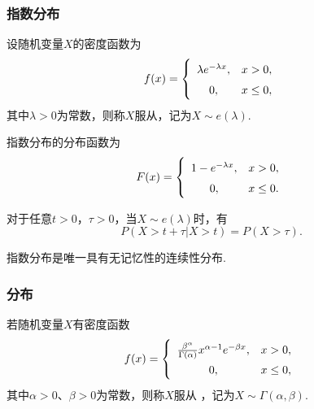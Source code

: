 \subsubsection{指数分布}
\begin{definition}
设随机变量\(X\)的密度函数为\begin{equation}
f(x) = \left\{ \def\arraystretch{1.5}
\begin{array}{cl}
\lambda e^{-\lambda x}, & x > 0, \\
0, & x \leq 0, \\
\end{array} \right.
\end{equation}其中\(\lambda > 0\)为常数，则称\(X\)服从，记为\(X \sim e(\lambda)\).
\end{definition}

\begin{theorem}
指数分布的分布函数为\begin{equation}
F(x) = \left\{ \def\arraystretch{1.5}
\begin{array}{cl}
1 - e^{-\lambda x}, & x > 0, \\
0, & x \leq 0. \\
\end{array} \right.
\end{equation}
\end{theorem}

\begin{theorem}[指数分布的无记忆性]
对于任意\(t > 0\)，\(\tau > 0\)，当\(X \sim e(\lambda)\)时，有\[
P(X > t + \tau \vert X > t) = P(X > \tau).
\]

指数分布是唯一具有无记忆性的连续性分布.
\end{theorem}

\subsubsection{\textGamma 分布}
\begin{definition}
若随机变量\(X\)有密度函数\begin{equation}
f(x) = \left\{
\def\arraystretch{1.5}
\begin{array}{cl}
\frac{\beta^{\alpha}}{\Gamma(\alpha)} x^{\alpha-1} e^{-\beta x}, & x > 0, \\
0, & x \leq 0, \\
\end{array} \right.
\end{equation}其中\(\alpha > 0\)、\(\beta > 0\)为常数，则称\(X\)服从 ，记为\(X \sim \Gamma(\alpha,\beta)\).
\end{definition}

